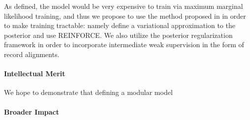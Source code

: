 \documentclass[11pt]{article}
\begin{document}
As defined, the model would be very expensive to train via maximum marginal likelihood
training, and thus we propose to use the method proposed in \citep{deng2018vattn}
in order to make training tractable: namely define a variational approximation to the
posterior and use REINFORCE.
We also utilize the posterior regularization framework in order to incorporate 
intermediate weak supervision in the form of record alignments.

% 
\paragraph{Intellectual Merit}
We hope to demonstrate that defining a modular model 
\paragraph{Broader Impact}



\end{document}
